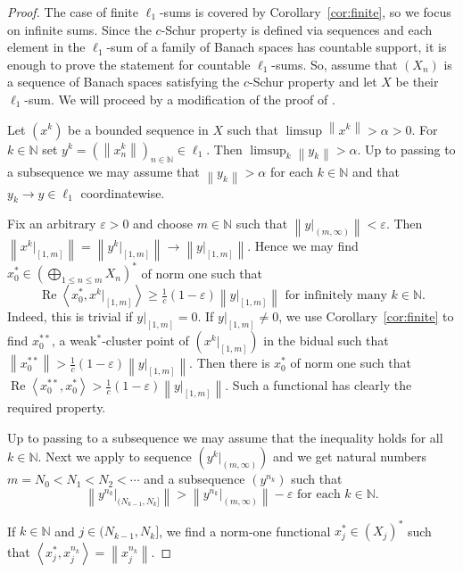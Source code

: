 \documentclass{amsart}
\numberwithin{equation}{section}
\theoremstyle{definition}
\def\ep{\varepsilon}
\def\en{\mathbb N}
\def\ip#1#2{\left\langle#1,#2\right\rangle}
\newcommand{\norm}[1]{\left\|#1\right\|}
\renewcommand{\Re}{\operatorname{Re}}
\begin{document}
\begin{proof} 
    The case of finite $\ell_1$-sums is covered by Corollary~\ref{cor:finite}, so we focus on infinite sums.
    Since the $c$-Schur property is defined via sequences and each element in the $\ell_1$-sum of a family of Banach spaces has countable support, it is enough to prove the statement for countable $\ell_1$-sums. 
    So, assume that $(X_n)$ is a sequence of Banach spaces satisfying the $c$-Schur property and let $X$ be their $\ell_1$-sum. We will proceed by a modification of the proof of \cite[Theorem 1.3]{qschur}.
    
    Let $(x^k)$ be a bounded sequence in $X$ such that $\limsup\norm{x^k}>\alpha>0$.  For $k\in\en$ set $y^k=(\norm{x^k_n})_{n\in\en}\in\ell_1$. Then
    $\limsup_k\norm{y_k}>\alpha$. Up to passing to a subsequence we may assume that $\norm{y_k}>\alpha$ for each $k\in\en$ and that $y_k\to y\in\ell_1$ coordinatewise. 
    
    Fix an arbitrary $\ep>0$ and choose $m\in\en$ such that $\norm{y|_{(m,\infty)}}<\ep$. Then $\norm{x^k|_{[1,m]}}=\norm{y^k|_{[1,m]}}\to \norm{y|_{[1,m]}}$. Hence we may find $x_0^*\in (\bigoplus_{1\le n\le m} X_n)^*$ of norm one such that
    $$\Re\ip{x_0^*}{x^k|_{[1,m]}}\ge\tfrac1c(1-\ep)\norm{y|_{[1,m]}}\mbox{ for infinitely many }k\in\en.$$
    Indeed, this is trivial if $y|_{[1,m]}=0$. If $y|_{[1,m]}\ne0$, we use Corollary~\ref{cor:finite} to find $x_0^{**}$, a weak$^*$-cluster point of $(x^k|_{[1,m]})$ in the bidual such that $\norm{x_0^{**}}>\frac1c(1-\ep)\norm{y|_{[1,m]}}$. Then there is $x_0^*$ of norm one such that $\Re\ip{x_0^{**}}{x_0^*}>\frac1c(1-\ep)\norm{y|_{[1,m]}}$. Such a functional has clearly the required property.

    Up to passing to a subsequence we may assume that the inequality holds for all $k\in\en$.
    Next we apply \cite[Lemma 2.1]{qschur} to sequence $(y^k|_{(m,\infty)})$ and we get natural numbers $m=N_0<N_1<N_2<\cdots$  and a subsequence $(y^{n_k})$ such that
    $$\norm{y^{n_k}|_{(N_{k-1},N_k]}}>\norm{y^{n_k}|_{(m,\infty)}}-\ep\mbox{ for each }k\in\en.$$

    If $k\in\en$ and $j\in (N_{k-1},N_k]$, we find a norm-one functional $x_j^*\in (X_j)^*$ such that
    $\ip{x_j^*}{x^{n_k}_j}=\norm{x^{n_k}_j}$.


\end{proof}
\end{document}

